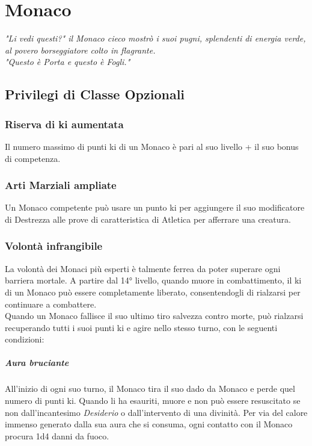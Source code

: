 \chapter{Monaco}

\begin{DndReadAloud}
  \it
  "Li vedi questi?" il Monaco cieco mostrò i suoi pugni, splendenti di energia verde, al povero borseggiatore colto in flagrante. \\ "Questo è Porta e questo è Fogli."
\end{DndReadAloud}

\section{Privilegi di Classe Opzionali}

\subsection{Riserva di ki aumentata}

Il numero massimo di punti ki di un Monaco è pari al suo livello + il suo bonus di competenza.

\subsection{Arti Marziali ampliate}

Un Monaco competente può usare un punto ki per aggiungere il suo modificatore di Destrezza alle prove di caratteristica di Atletica per afferrare una creatura.

\subsection{Volontà infrangibile}

La volontà dei Monaci più esperti è talmente ferrea da poter superare ogni barriera mortale. A partire dal 14° livello, quando muore in combattimento, il ki di un Monaco può essere completamente liberato, consentendogli di rialzarsi per continuare a combattere.\\ Quando un Monaco fallisce il suo ultimo tiro salvezza contro morte, può rialzarsi recuperando tutti i suoi punti ki e agire nello stesso turno, con le seguenti condizioni: \\
\paragraph{Aura bruciante} All'inizio di ogni suo turno, il Monaco tira il suo dado da Monaco e perde quel numero di punti ki. Quando li ha esauriti, muore e non può essere resuscitato se non dall'incantesimo \textit{Desiderio} o dall'intervento di una divinità. Per via del calore immenso generato dalla sua aura che si consuma, ogni contatto con il Monaco procura 1d4 danni da fuoco.
